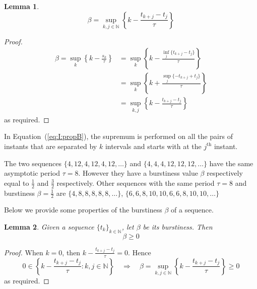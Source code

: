 \documentclass[12pt,draftcls,onecolumn]{IEEEtran} %
\newtheorem{lemma}{Lemma}
\newcommand{\NN}{\mathbb{N}}
\begin{document}
\begin{lemma}
  \begin{equation}
    \beta=\sup_{k,j\in\NN}\left\{k-\frac{t_{k+j}-t_j}{\tau}\right\}
    \label{eq:I:propB}
  \end{equation}
\end{lemma}
\begin{proof}
  \begin{align*}
    \beta= \sup_k\left\{k-\frac{s_k}{\tau}\right\}
    & = \sup_k\left\{k-\frac{\inf_j\{t_{k+j}-t_j\}}\tau\right\} \\
    & = \sup_k\left\{k+\frac{\sup_j\{-t_{k+j}+t_j\}}\tau\right\} \\
    & = \sup_{k,j}\left\{k-\frac{t_{k+j}-t_j}\tau\right\}
  \end{align*}
  as required.
\end{proof}

In Equation~(\ref{eq:I:propB}), the supremum is performed on all the
pairs of instants that are separated by $k$ intervals and starts with
at the $j^\text{th}$ instant. 

The two sequences $\{4,12,4,12,4,12,\ldots\}$ and
$\{4,4,4,12,12,12,\ldots\}$ have the same asymptotic period
$\tau=8$. However they have a burstiness value $\beta$ respectively
equal to $\frac 12$ and $\frac 32$ respectively. Other sequences with
the same period $\tau=8$ and burstiness $\beta=\frac 12$ are
$\{4,8,8,8,8,8,\ldots\}$, $\{6,6,8,10,10,6,6,8,10,10,\ldots\}$

Below we provide some properties of the burstiness $\beta$ of a sequence.
\begin{lemma}
  Given a sequence $\{t_k\}_{k\in\NN}$, let $\beta$ be its burstiness.
  Then
  \begin{equation*}
    \beta\geq 0
  \end{equation*}
\end{lemma}
\begin{proof}
  When $k=0$, then $k-\frac{t_{k+j}-t_j}\tau=0$. Hence
  \begin{equation*}
    0\in\left\{k-\frac{t_{k+j}-t_j}\tau:k,j\in\NN\right\}
    \quad\Rightarrow\quad
    \beta=\sup_{k,j\in\NN}\left\{k-\frac{t_{k+j}-t_j}\tau\right\}\geq 0  
  \end{equation*}
  as required.
\end{proof}
\end{document}
